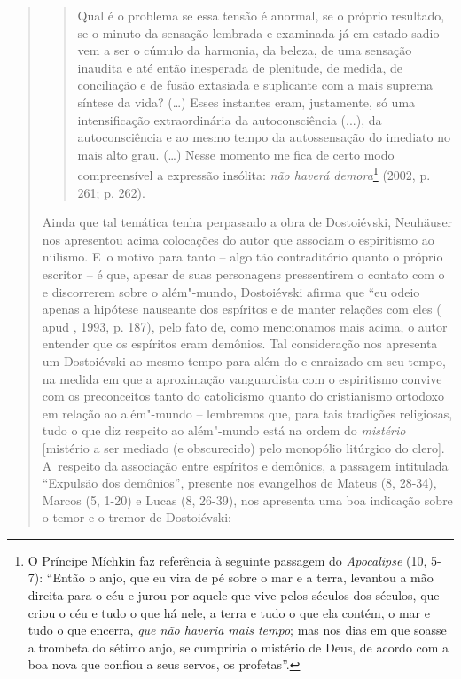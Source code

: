 {\begin{quote}
\begin{quote}
Qual é o problema se essa tensão é anormal, se o próprio resultado, se o
minuto da sensação lembrada e examinada já em estado sadio vem a ser o
cúmulo da harmonia, da beleza, de uma sensação inaudita e até então
inesperada de plenitude, de medida, de conciliação e de fusão extasiada
e suplicante com a mais suprema síntese da vida? (\ldots{}) Esses
instantes eram, justamente, só uma intensificação extraordinária da
autoconsciência (...), da autoconsciência e ao mesmo tempo da
autossensação do imediato no mais alto grau. (\ldots{}) Nesse momento me
fica de certo modo compreensível a expressão insólita: \emph{não haverá
demora}\footnote{O Príncipe Míchkin faz referência à seguinte passagem
  do \emph{Apocalipse} (10, 5-7): ``Então o anjo, que eu vira de pé
  sobre o mar e a terra, levantou a mão direita para o céu e jurou por
  aquele que vive pelos séculos dos séculos, que criou o céu e tudo o
  que há nele, a terra e tudo o que ela contém, o mar e tudo o que
  encerra, \emph{que não haveria mais tempo}; mas nos dias em que soasse
  a trombeta do sétimo anjo, se cumpriria o mistério de Deus, de acordo
  com a boa nova que confiou a seus servos, os profetas''.} (2002, p.
261; p. 262).
\end{quote}

Ainda que tal temática tenha perpassado a obra de Dostoiévski, Neuhäuser
nos apresentou acima colocações do autor que associam o espiritismo ao
niilismo. E~o motivo para tanto -- algo tão contraditório quanto o
próprio escritor -- é que, apesar de suas personagens pressentirem o
contato com o e discorrerem sobre o além"-mundo, Dostoiévski afirma que
``eu odeio apenas a hipótese nauseante dos espíritos e de manter
relações com eles ( apud , 1993, p. 187), pelo fato
de, como mencionamos mais acima, o autor entender que os espíritos eram
demônios. Tal consideração nos apresenta um Dostoiévski ao mesmo tempo
para além do e enraizado em seu tempo, na medida em que a aproximação
vanguardista com o espiritismo convive com os preconceitos tanto do
catolicismo quanto do cristianismo ortodoxo em relação ao além"-mundo --
lembremos que, para tais tradições religiosas, tudo o que diz respeito
ao além"-mundo está na ordem do \emph{mistério} {[}mistério a ser mediado
(e obscurecido) pelo monopólio litúrgico do clero{]}. A~respeito da
associação entre espíritos e demônios, a passagem intitulada ``Expulsão
dos demônios'', presente nos evangelhos de Mateus (8, 28-34), Marcos (5,
1-20) e Lucas (8, 26-39), nos apresenta uma boa indicação sobre o temor
e o tremor de Dostoiévski:


\end{quote}}

